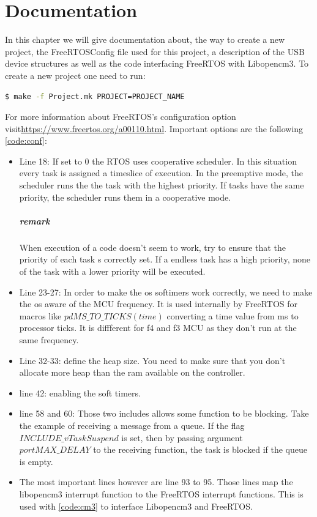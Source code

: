 \documentclass[12pt,a4paper]{report}
\begin{document}
\chapter{Documentation}
\label{chap:doc}
In this chapter we will give documentation about, the way to create a new project, the FreeRTOSConfig file used for this project, a description of the USB device structures as well as the code interfacing FreeRTOS with Libopencm3.\newline
To create a new project one need to run:
\begin{lstlisting}[language=bash]
$ make -f Project.mk PROJECT=PROJECT_NAME
\end{lstlisting}
For more information about FreeRTOS's configuration option visit\newline \href{https://www.freertos.org/a00110.html}{https://www.freertos.org/a00110.html}.
Important options are the following \ref{code:conf}:
\begin{itemize}
    \item Line 18: If set to 0 the RTOS uses cooperative scheduler. In this situation every task is assigned a timeslice of execution. In the preemptive mode, the scheduler runs the the task with the highest priority. If tasks have the same priority, the scheduler runs them in a cooperative mode. 
\paragraph{remark} When execution of a code doesn't seem to work, try to ensure that the priority of each task s correctly set. If a endless task has a high priority, none of the task with a lower priority will be executed.
    \item Line 23-27: In order to make the os softimers work correctly, we need to make the os aware of the MCU frequency. It is used internally by FreeRTOS for macros like $pdMS\_TO\_TICKS(time)$ converting a time value from ms to processor ticks. It is diffferent for f4 and f3 MCU as they don't run at the same frequency.
    \item Line 32-33: define the heap size. You need to make sure that you don't allocate more heap than the ram available on the controller.
    \item line 42: enabling the soft timers.
    \item line 58 and 60: Those two includes allows some function to be blocking. Take the example of receiving a message from a queue. If the flag $INCLUDE\_vTaskSuspend$ is set, then by passing argument $portMAX\_DELAY$ to the receiving function, the task is blocked if the queue is empty.
    \item The most important lines however are line 93 to 95. Those lines map the libopencm3 interrupt function to the FreeRTOS interrupt functions. This is used with \ref{code:cm3} to interface Libopencm3 and FreeRTOS. 
\end{itemize}
\end{document}
